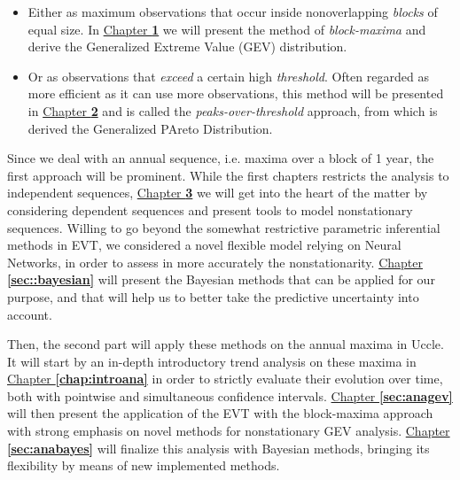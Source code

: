\documentclass[11pt,a4paper,openany, twosided]{book}
\makeatletter
\renewcommand\part{%
	\if@openright
	\cleardoublepage
	\else
	\clearpage
	\fi
	\thispagestyle{empty}%
	\if@twocolumn
	\onecolumn
	\@tempswatrue
	\else
	\@tempswafalse
	\fi
	\null\vfil
	\secdef\@part\@spart}
\makeatother
\begin{document}
\begin{itemize}
	\item Either as maximum observations that occur inside nonoverlapping \emph{blocks} of equal size.
	In \hyperref[sec::1]{Chapter \textbf{1}} we will present the method of \emph{block-maxima} and derive the Generalized Extreme Value (GEV) distribution.
	\item Or as observations that \emph{exceed} a certain high \emph{threshold}. Often regarded as more efficient as it can use more observations, this method will be presented in  \hyperref[sec::2]{Chapter \textbf{2}} and is called the \emph{peaks-over-threshold} approach, from which is derived the Generalized PAreto Distribution.
\end{itemize}
Since we deal with an annual sequence, i.e.  maxima over a block of 1 year, the first approach will be prominent.
While the first chapters restricts the analysis to independent sequences, \hyperref[sec::3]{Chapter \textbf{3}} we will get into the heart of the matter by considering dependent sequences and present tools to model nonstationary sequences.
Willing to go beyond the somewhat restrictive parametric inferential methods in EVT, we considered a novel flexible model relying on Neural Networks, in order to assess in more accurately the nonstationarity.
\hyperref[sec::bayesian]{Chapter \textbf{\ref{sec::bayesian}}} will present the Bayesian methods that can be applied for our purpose, and that will help us to better take the predictive uncertainty into account.

Then, the second part will apply these methods on the annual maxima in Uccle. It will start by an in-depth introductory trend analysis on these maxima in \hyperref[chap:introana]{Chapter \textbf{\ref{chap:introana}}} in order to strictly evaluate their evolution over time, both with pointwise and simultaneous confidence intervals. 
\hyperref[sec:anagev]{Chapter \textbf{\ref{sec:anagev}}} will then present the application of the EVT with the block-maxima approach with strong emphasis on novel methods for nonstationary GEV analysis.
\hyperref[sec:anabayes]{Chapter \textbf{\ref{sec:anabayes}}} will finalize this analysis with Bayesian methods, bringing its flexibility by means of new implemented methods.

\thispagestyle{empty}



\begin{center}
\part{Theoretical Framework : Extreme Value Theory}\label{part1}
\end{center}
\end{document}
